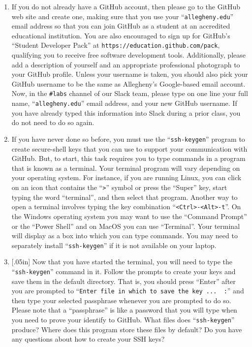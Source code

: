 \documentclass[11pt]{article}
\newcommand{\command}[1]{``\lstinline{#1}''}
\newcommand{\url}[1]{\lstinline{#1}}
\newcommand{\channel}[1]{\lstinline{#1}}
\newcommand{\think}[1]{\null\hfill\LARGE{\faCogs{}}\newline\scriptsize{\em{#1}}}
\begin{document}
\begin{enumerate}

  \item If you do not already have a GitHub account, then please go to the
    GitHub web site and create one, making sure that you use your
    \command{allegheny.edu} email address so that you can join GitHub as a
    student at an accredited educational institution. You are also encouraged
    to sign up for GitHub's ``Student Developer Pack'' at
    \url{https://education.github.com/pack}, qualifying you to receive free
    software development tools. Additionally, please add a description of
    yourself and an appropriate professional photograph to your GitHub profile.
    Unless your username is taken, you should also pick your GitHub username to
    be the same as Allegheny's Google-based email account. Now, in the
    \channel{#labs} channel of our Slack team, please type on one line your
    full name, \command{allegheny.edu} email address, and your new GitHub
    username. If you have already typed this information into Slack during a
    prior class, you do not need to do so again.

  \item If you have never done so before, you must use the \command{ssh-keygen}
    program to create secure-shell keys that you can use to support your
    communication with GitHub. But, to start, this task requires you to type
    commands in a program that is known as a terminal.
    Your terminal program will vary depending on your operating system. For
    instance, if you are running Linux, you can click on an icon that contains
    the \command{>} symbol or press the ``Super'' key, start typing the word
    ``terminal'', and then select that program. Another way to open a terminal
    involves typing the key combination \command{<Ctrl>-<Alt>-t}.
    On the Windows operating system you may want to use the ``Command Prompt''
    or the ``Power Shell'' and on MacOS you can use ``Terminal''.
    Your terminal will display as a box into which you can type commands.
    You may need to separately install \command{ssh-keygen} if it is not
    available on your laptop.

  \item \marginnote{\think{Understand SSH keys}}[.05in] Now that you have
    started the terminal, you will need to type the \command{ssh-keygen} command
    in it. Follow the prompts to create your keys and save them in the default
    directory. That is, you should press ``Enter'' after you are prompted to
    \command{Enter file in which to save the key ...  :} and then type your
    selected passphrase whenever you are prompted to do so. Please note that a
    ``passphrase'' is like a password that you will type when you need to prove
    your identify to GitHub. What files does \command{ssh-keygen} produce? Where
    does this program store these files by default? Do you have any questions
    about how to create your SSH keys?


\end{enumerate}
\end{document}
